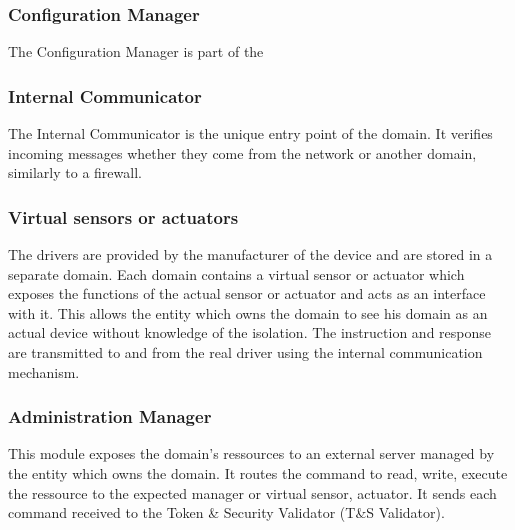 \documentclass[conference]{IEEEtran}
\begin{document}
\subsubsection{Configuration Manager}
\label{sec:Config_Mgr}
The Configuration Manager is part of the 

\subsubsection{Internal Communicator}
\label{sec:Int_Com}
The Internal Communicator is the unique entry point of the domain. It verifies incoming messages whether they come from the network or another domain, similarly to a firewall.


\subsubsection{Virtual sensors or actuators}
\label{sec:virtual_sensor}
The drivers are provided by the manufacturer of the device and are stored in a separate domain. Each domain contains a virtual sensor or actuator which exposes the functions of the actual sensor or actuator and acts as an interface with it. This allows the entity which owns the domain to see his domain as an actual device without knowledge of the isolation. The instruction and response are transmitted to and from the real driver using the internal communication mechanism.  

\subsubsection{Administration Manager}
\label{sec:Admin_Mgr}
This module exposes the domain's ressources to an external server managed by the entity which owns the domain. It routes the command to read, write, execute the ressource to the expected manager or virtual sensor, actuator. It sends each command received to the Token \& Security Validator (T\&S Validator). 
\end{document}
